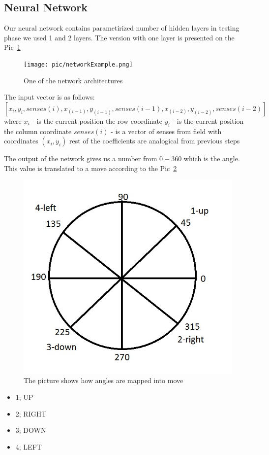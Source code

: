 \documentclass[a4paper]{article}
\begin{document}
	\subsection{Neural Network}
	Our neural network contains parametirized number of hidden layers in testing phase we 
	used 1 and 2 layers. The version with one layer is presented on the Pic~\ref{pic:networkExample}
	\begin{figure}[!h]
		\centering	
		\texttt{[image: pic/networkExample.png]}
		\caption{One of the network architectures}
		\label{pic:networkExample}
	\end{figure}
	
 The input vector is as follows:
	$$
		[x_i, y_i, senses(i), x_(i-1), y_(i-1), senses(i-1), x_(i-2), y_(i-2), senses(i-2)]
	$$
	where 
		$x_i$ - is the current position the row coordinate
		$y_i$ - is the current position the column coordinate
		$senses(i)$ - is a vector of senses from field with coordinates $(x_i, y_i)$
		rest of the coefficients are analogical from previous steps
	
	The output of the network gives us a number from $0-360$ which is the angle. This value
	is translated to a move according to the Pic~\ref{pic:compass}
	\begin{figure}[!h]
	\centering	
	\includegraphics[width=\textwidth]{pic/kompass.jpg}
	\caption{The picture shows how angles are mapped into move}
\label{pic:compass}
\end{figure}
	\begin{itemize}
		\item 1; UP
		\item 2; RIGHT
		\item 3; DOWN
		\item 4; LEFT
	\end{itemize}
	
\end{document}
